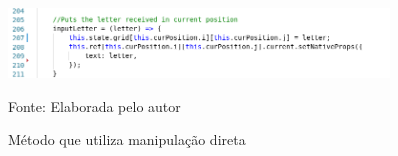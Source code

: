 \begin{figure}[H]
\centering
    \caption{Método que utiliza manipulação direta}
    \label{fig:codeDirectManipulation}
    \includegraphics[width=0.9\textwidth]{Figuras/codeDirectManipulation.png}
    
    Fonte: Elaborada pelo autor
\end{figure}


